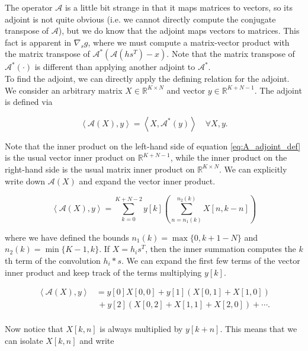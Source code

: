 \documentclass[journal]{IEEEtran}
\newcommand{\reals}{\mathbb{R}}
\begin{document}
\noindent The operator $\mathcal{A}$ is a little bit strange in that it maps matrices to vectors, so its adjoint is not quite obvious (i.e. we cannot directly compute the conjugate transpose of $\mathcal{A}$), but we do know that the adjoint maps vectors to matrices.  This fact is apparent in $\nabla_sg$, where we must compute a matrix-vector product with the matrix transpose of $\mathcal{A}^\ast\left(\mathcal{A}(hs^T)-x\right)$.  Note that the matrix transpose of $\mathcal{A}^\ast(\cdot)$ is different than applying another adjoint to $\mathcal{A}^\ast$.\\

To find the adjoint, we can directly apply the defining relation for the adjoint.  We consider an arbitrary matrix $X\in\reals^{K\times N}$ and vector $y\in\reals^{K+N-1}$.  The adjoint is defined via

\begin{equation}
   \label{eq:A_adjoint_def}
   \left\langle \mathcal{A}(X),y \right\rangle = \left\langle X, \mathcal{A}^\ast(y)\right\rangle \quad \forall X,y.
\end{equation}

\noindent Note that the inner product on the left-hand side of equation \ref{eq:A_adjoint_def} is the usual vector inner product on $\reals^{K+N-1}$, while the inner product on the right-hand side is the usual matrix inner product on $\reals^{K\times N}$.  We can explicitly write down $\mathcal{A}(X)$ and expand the vector inner product.

\[ \left\langle \mathcal{A}(X),y\right\rangle = \sum_{k=0}^{K+N-2}y[k] \left(\sum_{n=n_1(k)}^{n_2(k)} X[n,k-n]\right) \] 

\noindent where we have defined the bounds $n_1(k) = {\max\{0,k+1-N\}}$ and $n_2(k) = {\min\{K-1,k\}}$.  If $X=h_is^T$, then the inner summation computes the $k$th term of the convolution $h_i\ast s$.  We can expand the first few terms of the vector inner product and keep track of the terms multiplying $y[k]$.

\begin{align*}
   \left\langle\mathcal{A}(X),y\right\rangle &= y[0]X[0,0] + y[1]\left(X[0,1]+X[1,0]\right)\\
                                             &\,+ y[2]\left(X[0,2] + X[1,1] + X[2,0]\right) + \cdots.\\
\end{align*}

\noindent Now notice that $X[k,n]$ is always multiplied by $y[k+n]$.  This means that we can isolate $X[k,n]$ and write
\end{document}
